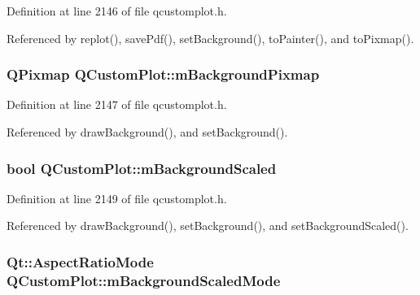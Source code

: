 Definition at line 2146 of file qcustomplot.\+h.



Referenced by replot(), save\+Pdf(), set\+Background(), to\+Painter(), and to\+Pixmap().

\hypertarget{class_q_custom_plot_ae8f4677399324a78c5f8dbfb95a34f90}{}
\subsubsection[{m\+Background\+Pixmap}]{\setlength{\rightskip}{0pt plus 5cm}Q\+Pixmap Q\+Custom\+Plot\+::m\+Background\+Pixmap\hspace{0.3cm}{\ttfamily [protected]}}\label{class_q_custom_plot_ae8f4677399324a78c5f8dbfb95a34f90}


Definition at line 2147 of file qcustomplot.\+h.



Referenced by draw\+Background(), and set\+Background().

\hypertarget{class_q_custom_plot_a62fe584b20680b1b2e1c7efb5c5416a5}{}
\subsubsection[{m\+Background\+Scaled}]{\setlength{\rightskip}{0pt plus 5cm}bool Q\+Custom\+Plot\+::m\+Background\+Scaled\hspace{0.3cm}{\ttfamily [protected]}}\label{class_q_custom_plot_a62fe584b20680b1b2e1c7efb5c5416a5}


Definition at line 2149 of file qcustomplot.\+h.



Referenced by draw\+Background(), set\+Background(), and set\+Background\+Scaled().

\hypertarget{class_q_custom_plot_ab82e8a5e3ad6b486f95d6da8bf49e9aa}{}
\subsubsection[{m\+Background\+Scaled\+Mode}]{\setlength{\rightskip}{0pt plus 5cm}Qt\+::\+Aspect\+Ratio\+Mode Q\+Custom\+Plot\+::m\+Background\+Scaled\+Mode\hspace{0.3cm}{\ttfamily [protected]}}\label{class_q_custom_plot_ab82e8a5e3ad6b486f95d6da8bf49e9aa}


